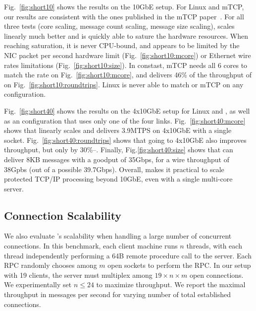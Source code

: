 

 Fig.~\ref{fig:short10} shows the results
on the 10GbE setup.  For Linux and mTCP, our results are consistent
with the ones published in the mTCP paper~\cite{jeong2014mtcp}.  For
all three tests (core scaling, message count scaling, message size
scaling), \ix scales linearly much better and is quickly able to
sature the hardware resources.  When reaching saturation, it is never
CPU-bound, and appears to be limited by the NIC packet per second
hardware limit (Fig.~\ref{fig:short10:mcore}) or Ethernet wire rates
limitations (Fig.~\ref{fig:short10:size}).  In constast, mTCP needs
all 6 cores to match the rate on Fig.~\ref{fig:short10:mcore}, and
delivers 46\% of the throughput of \ix on
Fig.~\ref{fig:short10:roundtrips}.  Linux is never able to match \ix
or mTCP on any configuration.



 Fig.~\ref{fig:short40} shows the results
on the 4x10GbE setup for Linux and \ix, as well as an \ix
configuration that uses only one of the four
links. Fig.~\ref{fig:short40:mcore} shows that \ix linearly scales and
delivers 3.9MTPS on 4x10GbE with a single socket.
Fig.~\ref{fig:short40:roundtrips} shows that going to 4x10GbE also
improves throughput, but only by 30\%--.  Finally,
Fig.\ref{fig:short40:size} shows that \ix can deliver 8KB messages
with a goodput of 35Gbps, for a wire throughput of 38Gpbs (out of a
possible 39.7Gbps).  Overall, \ix makes it practical to scale
protected TCP/IP processing beyond 10GbE, even with a single
multi-core server.


\subsection{Connection Scalability}

\label{sec:eval:scale}

We also evaluate \ix's scalability when handling a large number of
concurrent connections. In this benchmark, each client machine runs
$n$ threads, with each thread independently performing a 64B remote
procedure call to the server.  Each RPC randomly chooses among $m$
open sockets to perform the RPC.  In our setup with 19 clients, the
server must multiplex among $19 \times n \times m$ open connections.
We experimentally set $n \leq 24$ to maximize throughput.  We report
the maximal throughput in messages per second for varying number of
total established connections.

